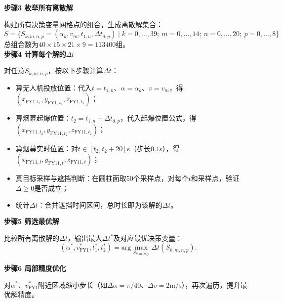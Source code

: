\documentclass[../main.tex]{subfiles}
\begin{document}
\noindent\textbf{步骤3 枚举所有离散解}

构建所有决策变量网格点的组合，生成离散解集合：
$$S = \{ S_{k,m,n,p}=(\alpha_k, v_m, t_{1,n}, \Delta t_{d,p}) \mid k=0,\dots,39;\ m=0,\dots,14;\ n=0,\dots,20;\ p=0,\dots,8 \}$$
总组合数为$40 \times 15 \times 21 \times 9 = 113400$组。\\[8pt]

\noindent\textbf{步骤4 计算每个解的$\Delta t$}

对任意$S_{k,m,n,p}$，按以下步骤计算$\Delta t$：
\begin{itemize}
    \item 算无人机投放位置：代入$t=t_{1,n}$、$\alpha=\alpha_k$、$v=v_m$，得$(x_{\text{FY1},t_1}, y_{\text{FY1},t_1}, z_{\text{FY1},t_1})$；
    \item 算烟幕起爆位置：$t_2=t_{1,n}+\Delta t_{d,p}$，代入起爆位置公式，得$(x_{\text{FY11},t_2}, y_{\text{FY11},t_2}, z_{\text{FY11},t_2})$；
    \item 算烟幕实时位置：对$t \in [t_2, t_2+20]$s（步长$0.1$s），得$(x_{\text{FY11},t}, y_{\text{FY11},t}, z_{\text{FY11},t})$；
    \item 真目标采样与遮挡判断：在圆柱面取50个采样点，对每个$t$和采样点，验证$\Delta \geq 0$是否成立；
    \item 统计$\Delta t$：合并遮挡时间区间，总时长即为该解的$\Delta t$。
\end{itemize}

\noindent\textbf{步骤5 筛选最优解}

比较所有离散解的$\Delta t$，输出最大$\Delta t^*$及对应最优决策变量：
$$(\alpha^*, v_{\text{FY1}}^*, t_1^*, t_2^*) = \mathrm{arg}\max _{S_{k,m,n,p}} \Delta t(S_{k,m,n,p}).$$

\noindent\textbf{步骤6 局部精度优化}

对$\alpha^*$、$v_{\text{FY1}}^*$附近区域缩小步长（如$\Delta\alpha=\pi/40$、$\Delta v=2$m/s），再次遍历，提升最优解精度。
\end{document}
